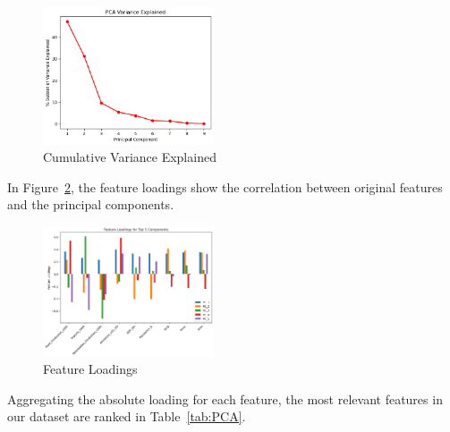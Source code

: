 \documentclass{ieeeaccess}
\begin{document}
\begin{figure}[htb]
    \centering
    \includegraphics[width=0.45\textwidth]{DIM-PCA/variance_explained.png}
    \caption{Cumulative Variance Explained}
    \label{fig:variance}
\end{figure}

In Figure~\ref{fig:loadings}, the feature loadings show the correlation between original features and the principal components.

\begin{figure}[htb]
    \centering
    \includegraphics[width=0.45\textwidth]{DIM-PCA/feature_loadings.png}
\caption{Feature Loadings}
    \label{fig:loadings}
\end{figure}

Aggregating the absolute loading for each feature, the most relevant features in our dataset are ranked in Table~\ref{tab:PCA}.
\end{document}
